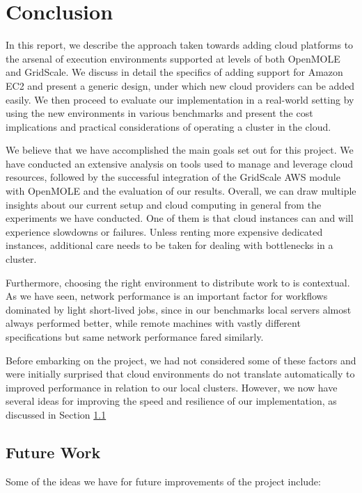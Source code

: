 \chapter{Conclusion}

In this report, we describe the approach taken towards adding cloud platforms to the arsenal of execution environments supported at levels of both OpenMOLE and GridScale. We discuss in detail the specifics of adding support for Amazon EC2 and present a generic design, under which new cloud providers can be added easily. We then proceed to evaluate our implementation in a real-world setting by using the new environments in various benchmarks and present the cost implications and practical considerations of operating a cluster in the cloud.

We believe that we have accomplished the main goals set out for this project. We have conducted an extensive analysis on tools used to manage and leverage cloud resources, followed by the successful integration of the GridScale AWS module with OpenMOLE and the evaluation of our results. Overall, we can draw multiple insights about our current setup and cloud computing in general from the experiments we have conducted. One of them is that cloud instances can and will experience slowdowns or failures. Unless renting more expensive dedicated instances, additional care needs to be taken for dealing with bottlenecks in a cluster. 

Furthermore, choosing the right environment to distribute work to is contextual. As we have seen, network performance is an important factor for workflows dominated by light short-lived jobs, since in our benchmarks local servers almost always performed better, while remote machines with vastly different specifications but same network performance fared similarly.

Before embarking on the project, we had not considered some of these factors and were initially surprised that cloud environments do not translate automatically to improved performance in relation to our local clusters. However, we now have several ideas for improving the speed and resilience of our implementation, as discussed in Section \ref{FutureWorkSection}

\section{Future Work} \label{FutureWorkSection}

Some of the ideas we have for future improvements of the project include:


